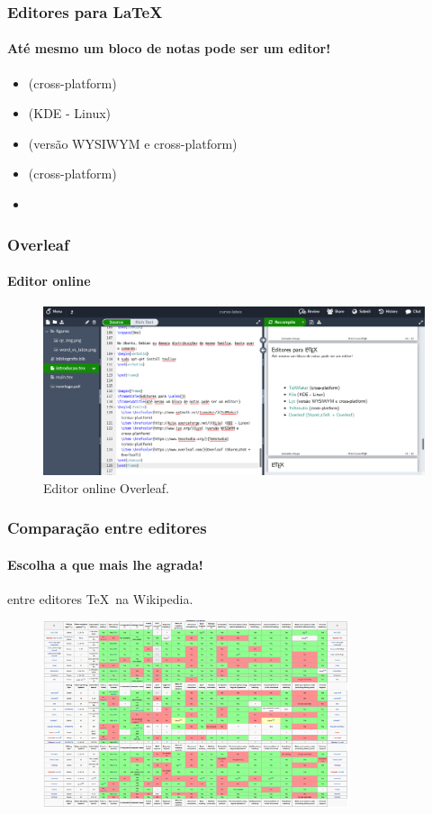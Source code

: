 \begin{frame}
\frametitle{Editores para \LaTeX{}}
\framesubtitle{Até mesmo um bloco de notas pode ser um editor!}
\begin{itemize}
  \item {} (cross-platform)
  \item {} (KDE - Linux)
  \item {} (versão WYSIWYM e cross-platform)
  \item {} (cross-platform)
  \item {}
\end{itemize}
\end{frame}


\begin{frame}
\frametitle{Overleaf}
\framesubtitle{Editor online}
\begin{figure}
    \centering
    \includegraphics[width=\textwidth,height=0.7\textheight,keepaspectratio]{figures/overleaf.png}
    \caption{Editor online Overleaf.}
    \label{fig:overleaf}
\end{figure}
\end{frame}


\begin{frame}
\frametitle{Comparação entre editores}
\framesubtitle{Escolha a que mais lhe agrada!}
   entre editores \TeX \ na Wikipedia.

  \begin{figure}[h!]
  \centering
  \includegraphics[width=0.8\textwidth,height=0.7\textheight,keepaspectratio]{figures/editorschart.png}
  \label{fig:editorschart}
  \end{figure}
\end{frame}



